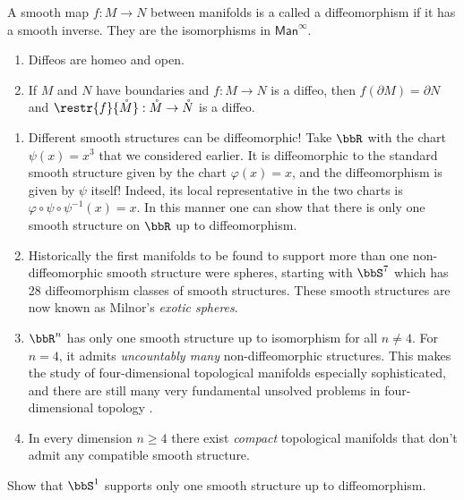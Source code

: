 \begin{defn}[Diffeomorphisms]
A smooth map $f:M\to N$ between manifolds is a called a diffeomorphism if it has a smooth inverse. They are the isomorphisms in $\mathsf{Man}^\infty$.
\end{defn}
\begin{prop}
\begin{enumerate}
    \item Diffeos are homeo and open.
    \item If $M$ and $N$ have boundaries and $f:M\to N$ is a diffeo, then $f(\partial M)=\partial N$ and $\restr{f}{\mathring M}: \mathring M\to \mathring N$ is a diffeo.
\end{enumerate}
\end{prop}
\begin{example}
\begin{enumerate}
    \item Different smooth structures can be diffeomorphic! Take $\bbR $ with the chart $\psi(x)=x^3$ that we considered earlier. It is diffeomorphic to the standard smooth structure given by the chart $\varphi(x)=x$, and the diffeomorphism is given by $\psi$ itself! Indeed, its local representative in the two charts is $\varphi\circ \psi \circ\psi^{-1}(x)=x$. In this manner one can show that there is only one smooth structure on $\bbR$ up to diffeomorphism.
    \item Historically the first manifolds to be found to support more than one non-diffeomorphic smooth structure were spheres, starting with $\bbS^7$ which has 28 diffeomorphism classes of smooth structures. These smooth structures are now known as Milnor's \emph{exotic spheres}.
    \item $\bbR^n$ has only one smooth structure up to isomorphism for all $n\neq 4$. For $n=4$, it admits \emph{uncountably many} non-diffeomorphic structures. This makes the study of four-dimensional topological manifolds especially sophisticated, and there are still many very fundamental unsolved problems in four-dimensional topology \cite{smooth.structures}.
    \item In every dimension $n\geq 4$ there exist \emph{compact} topological manifolds that don't admit any compatible smooth structure.
\end{enumerate}
\end{example}

\begin{xca}
    Show that $\bbS^1$ supports only one smooth structure up to diffeomorphism.
\end{xca}


